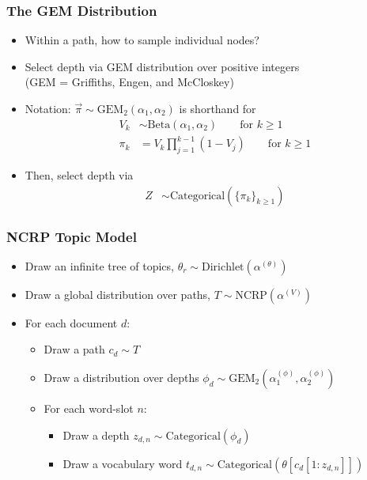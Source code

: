 \begin{frame}
\frametitle{The GEM Distribution}
\begin{itemize}[<+->]
\item Within a path, how to sample individual nodes?
\item Select depth via GEM distribution over positive integers \\
(GEM = Griffiths, Engen, and McCloskey)
\item Notation: $\vec \pi \sim \text{GEM}_2(\alpha_1, \alpha_2)$ is shorthand for
\begin{align*}
V_k &\sim \text{Beta}(\alpha_1, \alpha_2) \qquad \text{for } k \geq 1 \\
\pi_k &= V_k \prod_{j=1}^{k-1} (1-V_j) \qquad \text{for } k \geq 1
\end{align*}
\item Then, select depth via
\begin{align*}
Z &\sim \text{Categorical}(\{\pi_k\}_{k \geq 1})
\end{align*}
\end{itemize}
\end{frame}

\begin{frame}
\frametitle{NCRP Topic Model}
\begin{itemize}[<+->]
\item Draw an infinite tree of topics, $\theta_r \sim \text{Dirichlet}(\alpha^{(\theta)})$
\item Draw a global distribution over paths, $T \sim \text{NCRP}(\alpha^{(V)})$
\item For each document $d$:
    \begin{itemize}
    \item Draw a path $c_d \sim T$
    \item Draw a distribution over depths $\phi_d \sim \text{GEM}_2(\alpha^{(\phi)}_1, \alpha^{(\phi)}_2)$
    \item For each word-slot $n$:
        \begin{itemize}
        \item Draw a depth $z_{d,n} \sim \text{Categorical}(\phi_d)$
        \item Draw a vocabulary word $t_{d,n} \sim \text{Categorical}(\theta[c_d[1:z_{d,n}]])$
        \end{itemize}
    \end{itemize}
\end{itemize}
\end{frame}

